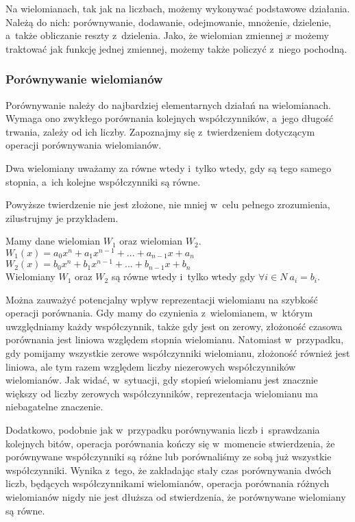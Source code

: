 Na wielomianach, tak jak na liczbach, możemy wykonywać podstawowe działania. Należą do nich: porównywanie, dodawanie, odejmowanie, mnożenie, dzielenie, a~także obliczanie reszty z~dzielenia. Jako, że wielomian zmiennej $x$ możemy traktować jak funkcję jednej zmiennej, możemy także policzyć z~niego pochodną.

\subsubsection{Porównywanie wielomianów}
Porównywanie należy do najbardziej elementarnych działań na wielomianach. Wymaga ono zwykłego porównania kolejnych współczynników, a~jego długość trwania, zależy od ich liczby. Zapoznajmy się z~twierdzeniem dotyczącym operacji porównywania wielomianów.

\begin{theorem}
	$ $\\
	Dwa wielomiany uważamy za równe wtedy i~tylko wtedy, gdy są tego samego stopnia, a~ich kolejne współczynniki są równe.
\end{theorem}

Powyższe twierdzenie nie jest złożone, nie mniej w~celu pełnego zrozumienia, zilustrujmy je przykładem. 

\begin{example}
	$ $\\
	Mamy dane wielomian $W_1$ oraz wielomian $W_2$. \\
	$W_1(x) = a_0x^n + a_1x^{n-1} + ... + a_{n-1}x + a_n$ \\
	$W_2(x) = b_0x^n + b_1x^{n-1} + ... + b_{n-1}x + b_n$ \\
	Wielomiany $W_1$ oraz $W_2 $ są równe wtedy i~tylko wtedy gdy
	$\forall{i\in N}\ a_i = b_i$.
\end{example}

Można zauważyć potencjalny wpływ reprezentacji wielomianu na szybkość operacji porównania. Gdy mamy do czynienia z~wielomianem, w~którym uwzględniamy każdy współczynnik, także gdy jest on zerowy, złożoność czasowa porównania jest liniowa względem stopnia wielomianu. Natomiast w~przypadku, gdy pomijamy wszystkie zerowe współczynniki wielomianu, złożoność również jest liniowa, ale tym razem względem liczby niezerowych współczynników wielomianów. Jak widać, w~sytuacji, gdy stopień wielomianu jest znacznie większy od liczby zerowych współczynników, reprezentacja wielomianu ma niebagatelne znaczenie.

Dodatkowo, podobnie jak w~przypadku porównywania liczb i~sprawdzania kolejnych bitów, operacja porównania kończy się w~momencie stwierdzenia, że porównywane współczynniki są różne lub porównaliśmy ze sobą już wszystkie współczynniki. Wynika z~tego, że zakładając stały czas porównywania dwóch liczb, będących współczynnikami wielomianów, operacja porównania różnych wielomianów nigdy nie jest dłuższa od stwierdzenia, że porównywane wielomiany są równe.


